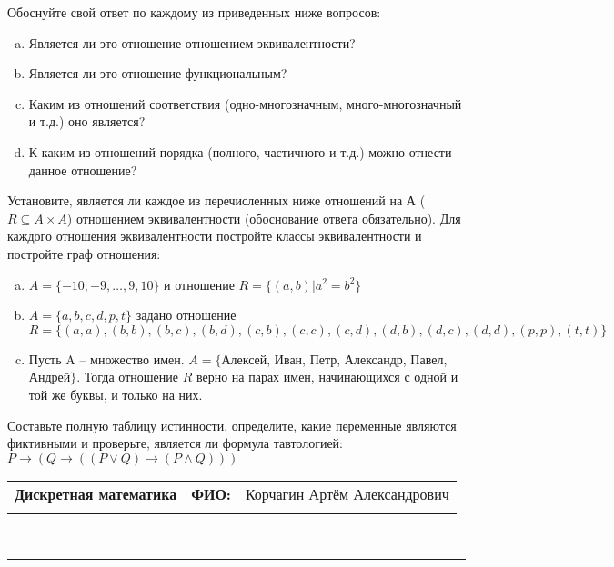 \documentclass[10pt]{exam}
\newcommand{\class}{Дискретная математика}
\newcommand{\examdate}{}
\begin{document}
\begin{questions}
Обоснуйте свой ответ по каждому из приведенных ниже вопросов:
\begin{enumerate} [a)]\setcounter{enumi}{0}
    \item Является ли это отношение отношением эквивалентности?
    \item Является ли это отношение функциональным?
    \item Каким из отношений соответствия (одно-многозначным, много-многозначный и т.д.) оно является?
    \item К каким из отношений порядка (полного, частичного и т.д.) можно отнести данное отношение?
\end{enumerate}
\question
Установите, является ли каждое из перечисленных ниже отношений на А ($R \subseteq A \times A$) отношением эквивалентности (обоснование ответа обязательно). Для каждого отношения эквивалентности постройте классы 
эквивалентности и постройте граф отношения:
\begin{enumerate} [a)]\setcounter{enumi}{0}
\item $A = \{-10, -9, … , 9, 10\}$ и отношение $R = \{(a,b)|a^{2} = b^{2}\}$
\item $A = \{a, b, c, d, p, t\}$ задано отношение $R = \{(a, a), (b, b), (b, c), (b, d), (c, b), (c, c), (c, d), (d, b), (d, c), (d, d), (p,p), (t,t)\}$
\item Пусть A – множество имен. $A = \{ $Алексей, Иван, Петр, Александр, Павел, Андрей$ \}$. Тогда отношение $R$ верно на парах имен, начинающихся с одной и той же буквы, и только на них.
\end{enumerate}\question Составьте полную таблицу истинности, определите, какие переменные являются фиктивными и проверьте, является ли формула тавтологией:
$ P \rightarrow (Q \rightarrow ((P \lor Q) \rightarrow (P \land Q)))$

\end{questions}
\newpage
\begin{flushright}
\begin{tabular}{p{2.8in} r l}
\textbf{\class} & \textbf{ФИО:} &Корчагин Артём Александрович
\\

\textbf{\examdate} &&\\
\end{tabular}\\
\end{flushright}
\rule[1ex]{\textwidth}{.1pt}
\end{document}
